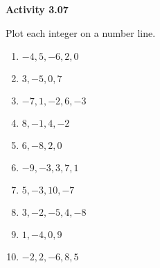 \vspace{0.3ex}
\noindent\textbf{Activity 3.07}

\vspace{0.2ex}

Plot each integer on a number line.
\begin{multicols}{2}
\begin{enumerate}[noitemsep, label = \color{blue}\arabic*. ]

    \item \( -4, 5, -6, 2, 0 \)
    \item \( 3, -5, 0, 7 \)
    \item \( -7, 1, -2, 6, -3 \)
    \item \( 8, -1, 4, -2 \)
    \item \( 6, -8, 2, 0 \)
    \item \( -9, -3, 3, 7, 1 \)
    \item \( 5, -3, 10, -7 \)
    \item \( 3, -2, -5, 4, -8 \)
    \item \( 1, -4, 0, 9 \)
    \item \( -2, 2, -6, 8, 5 \)
\end{enumerate}
\end{multicols}
